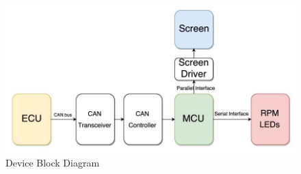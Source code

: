 \begin{figure}[H]
\begin{center}
\includegraphics[width=15cm]{Figures/block_diagram.jpg}
\end{center}
\caption{Device Block Diagram}
\label{fig:block_diagram}
\end{figure}
